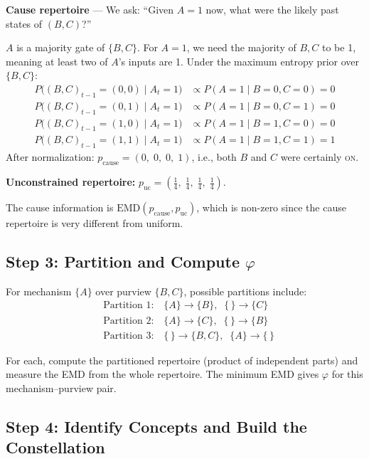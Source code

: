 \documentclass[11pt,a4paper]{report}
\newcommand{\EMD}{\mathrm{EMD}}
\begin{document}
\begin{examplebox}[Example: Mechanism $\{A\}$ in state $A{=}1$, Purview $\{B, C\}$]
\textbf{Cause repertoire} --- We ask: ``Given $A{=}1$ now, what were the likely past states of $(B, C)$?''

$A$ is a majority gate of $\{B, C\}$. For $A{=}1$, we need the majority of $B, C$ to be 1, meaning at least two of $A$'s inputs are 1. Under the maximum entropy prior over $\{B, C\}$:
\begin{align*}
  P\bigl((B,C)_{t-1} = (0,0) \mid A_t = 1\bigr) &\propto P(A{=}1 \mid B{=}0, C{=}0) = 0 \\
  P\bigl((B,C)_{t-1} = (0,1) \mid A_t = 1\bigr) &\propto P(A{=}1 \mid B{=}0, C{=}1) = 0 \\
  P\bigl((B,C)_{t-1} = (1,0) \mid A_t = 1\bigr) &\propto P(A{=}1 \mid B{=}1, C{=}0) = 0 \\
  P\bigl((B,C)_{t-1} = (1,1) \mid A_t = 1\bigr) &\propto P(A{=}1 \mid B{=}1, C{=}1) = 1
\end{align*}
After normalization: $p_{\text{cause}} = (0,\; 0,\; 0,\; 1)$, i.e., both $B$ and $C$ were certainly \textsc{on}.

\textbf{Unconstrained repertoire:} $p_{\text{uc}} = (\tfrac{1}{4},\; \tfrac{1}{4},\; \tfrac{1}{4},\; \tfrac{1}{4})$.

The cause information is $\EMD(p_{\text{cause}}, p_{\text{uc}})$, which is non-zero since the cause repertoire is very different from uniform.
\end{examplebox}

\subsection{Step 3: Partition and Compute $\varphi$}

For mechanism $\{A\}$ over purview $\{B, C\}$, possible partitions include:
\begin{align*}
  &\text{Partition 1:}\quad \{A\} \to \{B\},\;\; \{\,\} \to \{C\} \\
  &\text{Partition 2:}\quad \{A\} \to \{C\},\;\; \{\,\} \to \{B\} \\
  &\text{Partition 3:}\quad \{\,\} \to \{B,C\},\;\; \{A\} \to \{\,\}
\end{align*}

For each, compute the partitioned repertoire (product of independent parts) and measure the EMD from the whole repertoire. The minimum EMD gives $\varphi$ for this mechanism--purview pair.

\subsection{Step 4: Identify Concepts and Build the Constellation}
\end{document}
